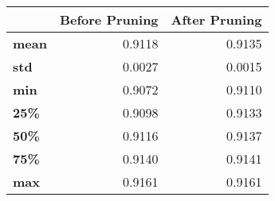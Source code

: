 \begin{tabular}{lrr}
\toprule
{} &  Before Pruning &  After Pruning \\
\midrule
\textbf{mean} &          0.9118 &         0.9135 \\
\textbf{std } &          0.0027 &         0.0015 \\
\textbf{min } &          0.9072 &         0.9110 \\
\textbf{25\% } &          0.9098 &         0.9133 \\
\textbf{50\% } &          0.9116 &         0.9137 \\
\textbf{75\% } &          0.9140 &         0.9141 \\
\textbf{max } &          0.9161 &         0.9161 \\
\bottomrule
\end{tabular}
